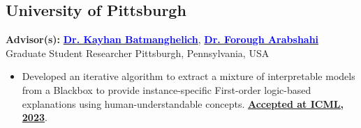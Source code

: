     \subsection{University of Pittsburgh}
      {\textbf{Advisor(s):} {\href{https://www.batman-lab.com/} { \textbf{\textcolor{blue}{Dr. Kayhan Batmanghelich}}}},
      {\href{https://forougha.github.io/}
        { \textbf{\textcolor{blue}{Dr. Forough Arabshahi}}}}}%
      {Graduate Student Researcher}%
      {Pittsburgh, Pennsylvania, USA}%
      {}%
      {
        \begin{itemize}[itemsep=0pt, parsep=0pt]
        \item Developed an iterative algorithm to extract a mixture of interpretable models from a Blackbox to provide instance-specific First-order logic-based explanations using human-understandable concepts. \href{https://shantanu-ai.github.io/projects/ICML-2023-MoIE/}
        {\textbf{Accepted at ICML, 2023}}.
        \end{itemize} 
      }

